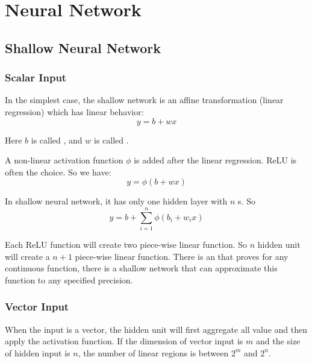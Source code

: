 \chapter{Neural Network}



\section{Shallow Neural Network}

\subsection{Scalar Input}

In the simplest case, the shallow network is an affine transformation (linear regression) which has linear behavior:
\begin{equation}
    y = b + wx
\end{equation}

Here $b$ is called , and $w$ is called .

A non-linear activation function $\phi$ is added after the linear regression. ReLU is often the choice. So we have:
\begin{equation}
    y = \phi (b + wx)
\end{equation}

In shallow neural network, it has only one hidden layer with $n$ s. So
\begin{equation}
    y = b + \sum_{i=1}^n \phi (b_i + w_i x)
\end{equation}

Each ReLU function will create two piece-wise linear function. So $n$ hidden unit will create a $n+1$ piece-wise linear function. There is an  that proves for any continuous function, there is a shallow network that can approximate this function to any specified precision.

\subsection{Vector Input}

When the input is a vector, the hidden unit will first aggregate all value and then apply the activation function. If the dimension of vector input is $m$ and the size of hidden input is $n$, the number of linear regions is between $2^m$ and $2^n$.




